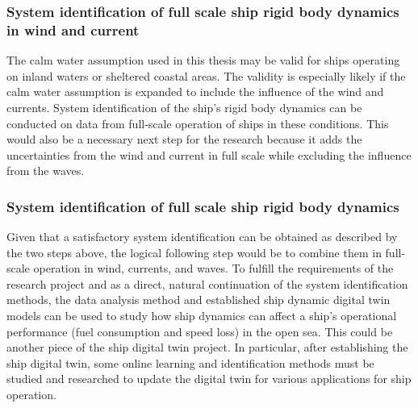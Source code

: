 \subsubsection*{\normalfont \color{black} \textbf{System identification of full scale ship rigid body dynamics in wind and current}}
The calm water assumption used in this thesis may be valid for ships operating on inland waters or sheltered coastal areas. The validity is especially likely if the calm water assumption is expanded to include the influence of the wind and currents. System identification of the ship's rigid body dynamics can be conducted on data from full-scale operation of ships in these conditions. This would also be a necessary next step for the research because it adds the uncertainties from the wind and current in full scale while excluding the influence from the waves.

\subsubsection*{\normalfont \color{black} \textbf{System identification of full scale ship rigid body dynamics}}
Given that a satisfactory system identification can be obtained as described by the two steps above, the logical following step would be to combine them in full-scale operation in wind, currents, and waves. To fulfill the requirements of the research project and as a direct, natural continuation of the system identification methods, the data analysis method and established ship dynamic digital twin models can be used to study how ship dynamics can affect a ship's operational performance (fuel consumption and speed loss) in the open sea. This could be another piece of the ship digital twin project. In particular, after establishing the ship digital twin, some online learning and identification methods must be studied and researched to update the digital twin for various applications for ship operation.